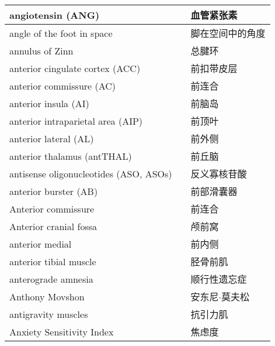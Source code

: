 \begin{longtable}{lll}
	\midrule
	angiotensin (ANG)     && 血管紧张素   \\
	
	\midrule
	angle of the foot in space     && 脚在空间中的角度   \\
	
	\midrule
	annulus of Zinn     && 总腱环   \\
	
	\midrule
	anterior cingulate cortex (ACC)     && 前扣带皮层   \\
	
	\midrule
	anterior commissure (AC)     && 前连合   \\
	
	\midrule
	anterior insula (AI)     && 前脑岛   \\
	
	\midrule
	anterior intraparietal area (AIP)     && 前顶叶   \\
	
	\midrule
	anterior lateral (AL)     && 前外侧   \\
	
	\midrule
	anterior thalamus (antTHAL)     && 前丘脑   \\
	
	\midrule
	antisense oligonucleotides (ASO, ASOs)     && 反义寡核苷酸   \\
	
	\midrule
	anterior burster  (AB)   && 	前部滑囊器   \\
	
	\midrule
	Anterior commissure     && 	前连合   \\
	
	\midrule
	Anterior cranial fossa     && 	颅前窝   \\
	
	\midrule
	anterior medial     && 	前内侧   \\
	
	\midrule
	anterior tibial muscle     && 	胫骨前肌   \\
	
	\midrule
	anterograde amnesia     && 	顺行性遗忘症   \\
	
	\midrule
	Anthony Movshon     && 	安东尼$\cdot$莫夫松   \\
	
	\midrule
	antigravity muscles     && 	抗引力肌   \\
	
	\midrule
	Anxiety Sensitivity Index     && 	焦虑度   \\
	

\end{longtable}
